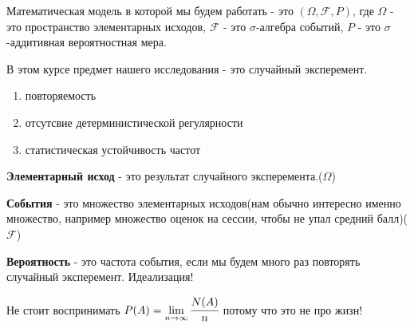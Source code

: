 Математическая модель в которой мы будем работать - это $(\Omega, \mathcal{F},
P)$, где $\Omega$ - это пространство элементарных исходов, $\mathcal{F}$ - это
$\sigma$-алгебра событий, $P$ - это $\sigma$-аддитивная вероятностная мера. 

В этом курсе предмет нашего исследования - это случайный эксперемент.
\begin{enumerate}
  \item повторяемость
  \item отсутсвие детерминистической регулярности
  \item статистическая устойчивость частот
\end{enumerate}

\textbf{ Элементарный исход} - это результат случайного эксперемента.($\Omega$)

\textbf{ События} - это множество элементарных исходов(нам обычно интересно именно множество,
например множество оценок на сессии, чтобы не упал средний
балл)($\mathcal{F}$)

\textbf{ Вероятность} - это частота события, если мы будем много
раз повторять случайный эксперемент. Идеализация!

Не стоит воспринимать $P(A) = \lim\limits_{n\to\infty } \cfrac{N(A)}{n} $ потому что это не про жизн!

